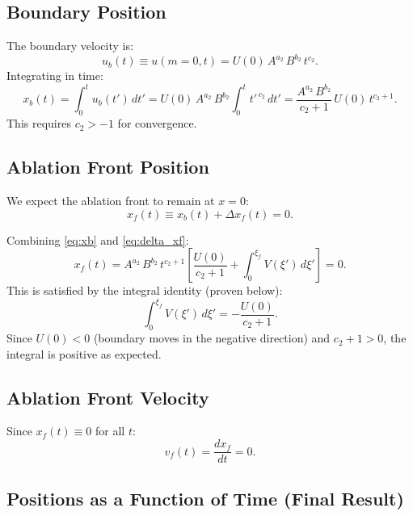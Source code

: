 \documentclass[11pt]{article}
\begin{document}
\subsection{Boundary Position}
\label{sec:boundary_pos}

The boundary velocity is:
\begin{equation}
  u_b(t) \equiv u(m{=}0,t) = U(0)\,A^{a_2}\,B^{b_2}\,t^{c_2}.
\end{equation}
Integrating in time:
\begin{equation}
  x_b(t) = \int_0^{t} u_b(t')\,dt'
  = U(0)\,A^{a_2}\,B^{b_2}\int_0^{t} t'^{\,c_2}\,dt'
  = \frac{A^{a_2}\,B^{b_2}}{c_2 + 1}\,U(0)\,t^{c_2+1}.
  \label{eq:xb}
\end{equation}
This requires $c_2 > -1$ for convergence.

\subsection{Ablation Front Position}

We expect the ablation front to remain at $x = 0$:
\begin{equation}
  x_f(t) \equiv x_b(t) + \Delta x_f(t) = 0.
  \label{eq:xf_zero}
\end{equation}

Combining \eqref{eq:xb} and \eqref{eq:delta_xf}:
\begin{equation}
  x_f(t) = A^{a_2}\,B^{b_2}\,t^{c_2+1}
    \left[\frac{U(0)}{c_2+1} + \int_0^{\xi_f} V(\xi')\,d\xi'\right] = 0.
\end{equation}
This is satisfied by the integral identity (proven below):
\begin{equation}
  \boxed{
  \int_0^{\xi_f} V(\xi')\,d\xi' = -\frac{U(0)}{c_2 + 1}.}
  \label{eq:V_integral_identity}
\end{equation}
Since $U(0) < 0$ (boundary moves in the negative direction) and $c_2 + 1 > 0$, the integral is positive as expected.

\subsection{Ablation Front Velocity}

Since $x_f(t) \equiv 0$ for all $t$:
\begin{equation}
  v_f(t) = \frac{dx_f}{dt} = 0.
\end{equation}

\subsection{Positions as a Function of Time (Final Result)}
\end{document}
